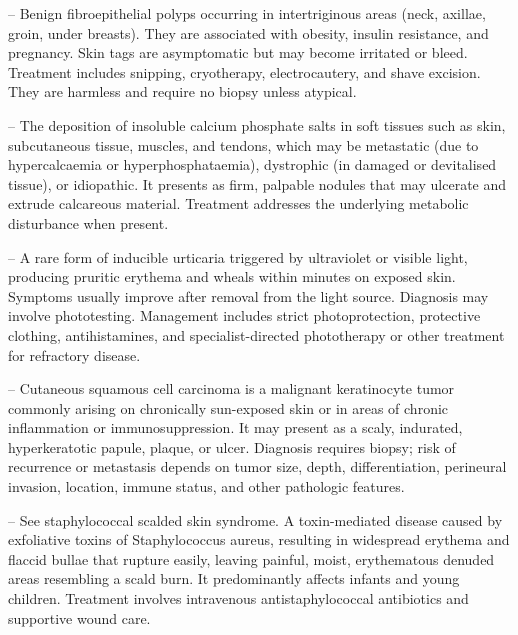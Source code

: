 -- Benign fibroepithelial polyps occurring in intertriginous areas (neck, axillae, groin, under breasts). They are associated with obesity, insulin resistance, and pregnancy. Skin tags are asymptomatic but may become irritated or bleed. Treatment includes snipping, cryotherapy, electrocautery, and shave excision. They are harmless and require no biopsy unless atypical.

-- The deposition of insoluble calcium phosphate salts in soft tissues such as skin, subcutaneous tissue, muscles, and tendons, which may be metastatic (due to hypercalcaemia or hyperphosphataemia), dystrophic (in damaged or devitalised tissue), or idiopathic. It presents as firm, palpable nodules that may ulcerate and extrude calcareous material. Treatment addresses the underlying metabolic disturbance when present.

-- A rare form of inducible urticaria triggered by ultraviolet or visible light, producing pruritic erythema and wheals within minutes on exposed skin. Symptoms usually improve after removal from the light source. Diagnosis may involve phototesting. Management includes strict photoprotection, protective clothing, antihistamines, and specialist-directed phototherapy or other treatment for refractory disease.

-- Cutaneous squamous cell carcinoma is a malignant keratinocyte tumor commonly arising on chronically sun-exposed skin or in areas of chronic inflammation or immunosuppression. It may present as a scaly, indurated, hyperkeratotic papule, plaque, or ulcer. Diagnosis requires biopsy; risk of recurrence or metastasis depends on tumor size, depth, differentiation, perineural invasion, location, immune status, and other pathologic features.

-- See staphylococcal scalded skin syndrome. A toxin-mediated disease caused by exfoliative toxins of Staphylococcus aureus, resulting in widespread erythema and flaccid bullae that rupture easily, leaving painful, moist, erythematous denuded areas resembling a scald burn. It predominantly affects infants and young children. Treatment involves intravenous antistaphylococcal antibiotics and supportive wound care.

